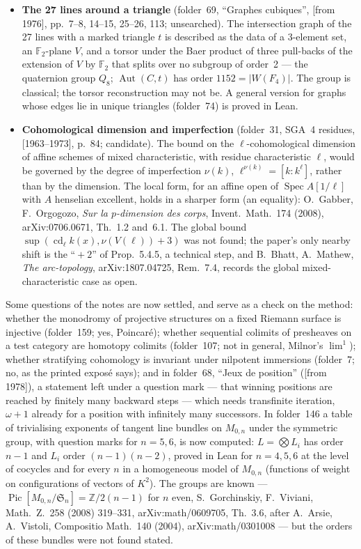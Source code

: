 \documentclass[11pt,a4paper]{article}
\newcommand{\q}[1]{“#1”}
\begin{document}
\begin{itemize}
\item \textbf{The 27 lines around a triangle} (folder~69, \q{Graphes
  cubiques}, [from 1976], pp.~7--8, 14--15, 25--26, 113; unsearched). The
  intersection graph of the 27 lines with a marked triangle $t$ is described as
  the data of a 3-element set, an $\mathbb F_2$-plane $V$, and a torsor under
  the Baer product of three pull-backs of the extension of $V$ by
  $\mathbb F_2$ that splits over no subgroup of order~2 --- the quaternion
  group $Q_8$; $\operatorname{Aut}(C, t)$ has order $1152 = |W(F_4)|$. The
  group is classical; the torsor reconstruction may not be. A general version
  for graphs whose edges lie in unique triangles (folder~74) is proved in Lean.
\item \textbf{Cohomological dimension and imperfection} (folder~31, SGA~4
  residues, [1963--1973], p.~84; candidate). The bound on the
  $\ell$-cohomological dimension of affine schemes of mixed characteristic,
  with residue characteristic $\ell$, would be governed by the degree of
  imperfection $\nu(k)$, $\ell^{\nu(k)} = [k : k^\ell]$, rather than by the
  dimension. The local form, for an affine open of $\operatorname{Spec} A[1/\ell]$
  with $A$ henselian excellent, holds in a sharper form (an equality):
  O.~Gabber, F.~Orgogozo, \emph{Sur la $p$-dimension des corps}, Invent.\
  Math.\ 174 (2008), arXiv:0706.0671, Th.~1.2 and~6.1. The global bound
  $\sup(\operatorname{cd}_\ell k(x), \nu(V(\ell)) + 3)$ was not found; the
  paper's only nearby shift is the \q{${}+2$} of Prop.~5.4.5, a technical
  step, and B.~Bhatt, A.~Mathew, \emph{The arc-topology}, arXiv:1807.04725,
  Rem.~7.4, records the global mixed-characteristic case as open.
\end{itemize}

Some questions of the notes are now settled, and serve as a check on the
method: whether the monodromy of projective structures on a fixed Riemann
surface is injective (folder~159; yes, Poincaré); whether sequential colimits
of presheaves on a test category are homotopy colimits (folder~107; not in
general, Milnor's $\lim^1$); whether stratifying cohomology is invariant under
nilpotent immersions (folder~7; no, as the printed exposé says); and in
folder~68, \q{Jeux de position} ([from 1978]), a statement left under a
question mark --- that winning positions are reached by finitely many
backward steps --- which needs transfinite iteration, $\omega + 1$ already
for a position with infinitely many successors. In folder~146 a table of
trivialising exponents of tangent line bundles on $M_{0,n}$ under the
symmetric group, with question marks for $n = 5, 6$, is now computed: $L =
\bigotimes L_i$ has order $n - 1$ and $L_i$ order $(n-1)(n-2)$, proved in
Lean for $n = 4, 5, 6$ at the level of cocycles and for every $n$ in a
homogeneous model of $M_{0,n}$ (functions of weight on configurations of
vectors of $K^2$). The groups are known ---
$\operatorname{Pic}[M_{0,n}/\mathfrak S_n] = \mathbb Z/2(n-1)$ for $n$ even,
S.~Gorchinskiy, F.~Viviani, Math.\ Z.\ 258 (2008) 319--331,
arXiv:math/0609705, Th.~3.6, after A.~Arsie, A.~Vistoli, Compositio Math.\
140 (2004), arXiv:math/0301008 --- but the orders of these bundles were not
found stated.
\end{document}
